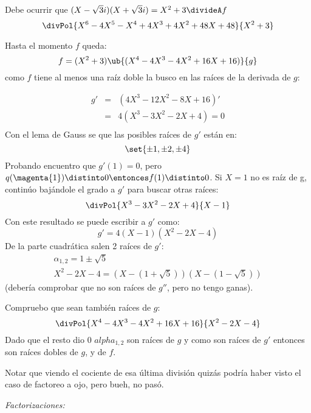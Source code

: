 \begin{enumerate}[label=\alph*)]
        Debe ocurrir que $(X - \sqrt{3}i)(X + \sqrt{3}i) = X^2 + 3 \divideA f$
        $$
          \divPol{X^6 - 4X^5 - X^4 + 4X^3 + 4X^2 + 48X + 48}{X^2 + 3}
        $$

        Hasta el momento $f$ queda:
        $$
          f = (X^2 + 3)\ub{(X^4 - 4X^3 - 4X^2 + 16X + 16)}{g}
        $$
        como $f$ tiene al menos una raíz doble la busco en las raíces de la derivada de $g$:\par
        $$
          \begin{array}{rcl}
            g' & = & (4X^3 - 12X^2 - 8 X + 16)' \\
               & = & 4(X^3 - 3X^2 - 2X + 4) = 0 \\
          \end{array}
        $$
        Con el lema de Gauss se que las posibles raíces de $g'$ están en:
        $$
          \set{\pm1,\pm2,\pm4}
        $$
        Probando encuentro que  $g'(1) = 0$, pero $q(\magenta{1}) \distinto 0 \entonces f(1) \distinto 0$. Si $X=1$ no es raíz de g,
        continúo bajándole el grado a $g'$ para buscar otras raíces:
        $$
          \divPol{X^3 - 3X^2 - 2X + 4}{X - 1}
        $$
        Con este resultado se puede escribir a $g'$ como:
        $$
          g' = 4(X-1)(X^2 - 2X -4)
        $$
        De la parte cuadrática salen 2 raíces de $g'$:
        $$
          \begin{array}{c}
            \alpha_{1,2} = 1 \pm \sqrt{5} \\
            X^2 - 2X -4 = (X - (1 + \sqrt{5}))(X - (1 - \sqrt{5}))
          \end{array}
        $$
        {\tiny(debería comprobar que no son raíces de $g''$, pero no tengo ganas).}

        Compruebo que sean también raíces de $g$:
        $$
          \divPol{X^4 - 4X^3 - 4X^2 + 16X + 16}{X^2 - 2X -4}
        $$
        Dado que el resto dio 0 $alpha_{1,2}$ son raíces de $g$ y como son raíces de $g'$ entonces son raíces dobles de $g$, y de $f$.

        Notar que viendo el cociente de esa última división quizás podría haber visto el caso de factoreo a ojo, pero bueh, no pasó.

        \textit{Factorizaciones: }
        \begin{center}
        \end{center}
\end{enumerate}
